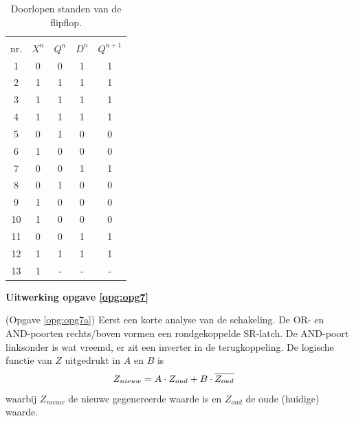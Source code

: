 \documentclass[a4paper,12pt,addpoints,fleqn,dutch,concept]{tisdexam}
\newcommand*{\oline}[1]{\overline{#1\mathstrut}}
\begin{document}
\begin{questions}
\begin{table}[H]
  \caption{Doorlopen standen van de flipflop.}
  \label{tab:ant_opg6}
  \begin{tabular}{ c | c c | c c }
    \hline
         &         &         &         &            \\ [-2.9ex]
     nr. & $X^{n}$ & $Q^{n}$ & $D^{n}$ & $Q^{n+1}$  \\ \hline
      1  &    0    &    0    &    1    &    1       \\
      2  &    1    &    1    &    1    &    1       \\
      3  &    1    &    1    &    1    &    1       \\
      4  &    1    &    1    &    1    &    1       \\
      5  &    0    &    1    &    0    &    0       \\
      6  &    1    &    0    &    0    &    0       \\
      7  &    0    &    0    &    1    &    1       \\ 
      8  &    0    &    1    &    0    &    0       \\
      9  &    1    &    0    &    0    &    0       \\
     10  &    1    &    0    &    0    &    0       \\
     11  &    0    &    0    &    1    &    1       \\
     12  &    1    &    1    &    1    &    1       \\
     13  &    1    &    -    &    -    &    -       \\ \hline
  \end{tabular}
\end{table}

\vspace{1em}

\textbf{Uitwerking opgave \ref{opg:opg7}}

(Opgave \ref{opg:opg7a}) Eerst een korte analyse van de schakeling. De OR- en
AND-poorten rechts/boven vormen een rondgekoppelde SR-latch. De AND-poort
linksonder is wat vreemd, er zit een inverter in de terugkoppeling. De
logische functie van $Z$ uitgedrukt in $A$ en $B$ is
\begin{equation*}
\begin{split}
Z_{nieuw} &= A \cdot Z_{oud} + B \cdot \oline{Z_{oud}}
\end{split}
\end{equation*}
waarbij $Z_{nieuw}$ de nieuwe gegenereerde waarde is en $Z_{oud}$ de oude
(huidige) waarde.


\end{questions}
\end{document}

